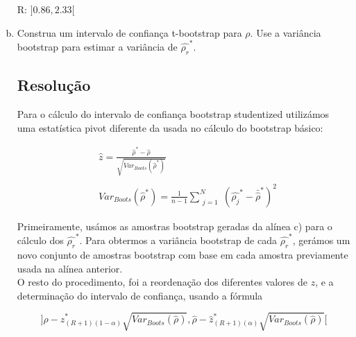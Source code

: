 \documentclass{article}
\begin{document}
\begin{enumerate}[(a)]
					R: $]0.86, 2.33[$

				\item Construa um intervalo de confiança t-bootstrap para $\rho$. Use a variância bootstrap para estimar a variância de $\hat{\rho_r}^*$.
				
				\subsection*{Resolução}	

					Para o cálculo do intervalo de confiança bootstrap studentized utilizámos uma estatística pivot diferente da usada no cálculo do bootstrap básico:

					\begin{align*}
						&\hat{z} = \frac{\hat{\rho}^* - \hat{\rho}}																	{\sqrt{Var_{Boots}(\hat{\rho}^*)}}\\\\
						&Var_{Boots}(\hat{\rho}^*) = \frac{1}{n-1}\sum_{\substack{j=1}}^{N}											(\hat{\rho_j}^* - \bar{\hat{\rho}}^*)^2
					\end{align*}	
					
\newpage
					
					Primeiramente, usámos as amostras bootstrap geradas da alínea c) para o cálculo dos $\hat{\rho_r}^*$. Para obtermos a variância bootstrap de cada $\hat{\rho_r}^*$, gerámos um novo conjunto de amostras bootstrap com base em cada amostra previamente usada na alínea anterior.\\
				    O resto do procedimento, foi a reordenação dos diferentes valores de $z$, e a determinação do intervalo de confiança, usando a fórmula

					\begin{equation*}												
							]\hat{\rho} - \hat{z}_{(R+1)(1 - \alpha)}^*\sqrt{Var_{Boots}(\hat{\rho})}, \hat{\rho} - \hat{z}_{(R+1)(\alpha)}^*\sqrt{Var_{Boots}(\hat{\rho})} [
					\end{equation*}	


\end{enumerate}
\end{document}
